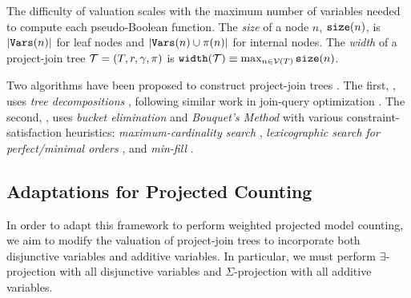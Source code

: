 The difficulty of valuation scales with the maximum number of variables needed to compute each pseudo-Boolean function. 
The \emph{size} of a node $n$, $\texttt{\upshape size}(n)$, is $\left| \texttt{\upshape Vars}(n) \right|$ for leaf nodes and $\left| \texttt{\upshape Vars}(n) \cup \pi(n) \right|$ for internal nodes.
The \emph{width} of a project-join tree $\mathcal{T} = (T, r, \gamma, \pi)$ is $\texttt{\upshape width}(\mathcal{T}) \equiv \max_{n \in \mathcal{V}(T)} \texttt{\upshape size}(n)$. 

Two algorithms have been proposed to construct project-join trees \cite{dudek2020dpmc}.
The first, \Lg{}, uses \emph{tree decompositions} \cite{RS91}, following similar work in join-query optimization \cite{DKV02,MPPV04}. The second,
\htb{}, uses \emph{bucket elimination} \cite{dechter99} and \emph{Bouquet's Method} \cite{bouquet1999gestion} with various constraint-satisfaction heuristics:  \emph{maximum-cardinality search} \cite{tarjan1984simple}, \emph{lexicographic search for perfect/minimal orders} \cite{koster2001treewidth}, and \emph{min-fill} \cite{dechter03}.



\subsection{Adaptations for Projected Counting}
In order to adapt this framework to perform weighted projected model counting, we aim to modify the valuation of project-join trees to incorporate both disjunctive variables and additive variables. In particular, we must perform $\exists$-projection with all disjunctive variables and $\Sigma$-projection with all additive variables.


